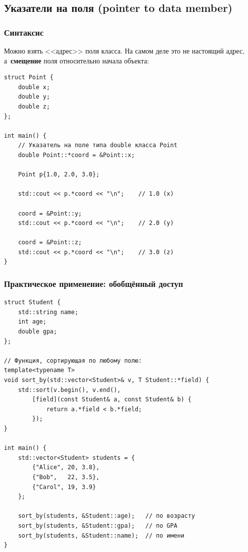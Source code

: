 \documentclass[a4paper,12pt]{article}
\begin{document}
\subsection{Указатели на поля (pointer to data member)}

\subsubsection{Синтаксис}

Можно взять <<адрес>> поля класса. На самом деле это не настоящий адрес,
а~\textbf{смещение} поля относительно начала объекта:

\begin{lstlisting}
struct Point {
    double x;
    double y;
    double z;
};

int main() {
    // Указатель на поле типа double класса Point
    double Point::*coord = &Point::x;

    Point p{1.0, 2.0, 3.0};

    std::cout << p.*coord << "\n";    // 1.0 (x)

    coord = &Point::y;
    std::cout << p.*coord << "\n";    // 2.0 (y)

    coord = &Point::z;
    std::cout << p.*coord << "\n";    // 3.0 (z)
}
\end{lstlisting}

\subsubsection{Практическое применение: обобщённый доступ}

\begin{lstlisting}
struct Student {
    std::string name;
    int age;
    double gpa;
};

// Функция, сортирующая по любому полю:
template<typename T>
void sort_by(std::vector<Student>& v, T Student::*field) {
    std::sort(v.begin(), v.end(),
        [field](const Student& a, const Student& b) {
            return a.*field < b.*field;
        });
}

int main() {
    std::vector<Student> students = {
        {"Alice", 20, 3.8},
        {"Bob",   22, 3.5},
        {"Carol", 19, 3.9}
    };

    sort_by(students, &Student::age);   // по возрасту
    sort_by(students, &Student::gpa);   // по GPA
    sort_by(students, &Student::name);  // по имени
}
\end{lstlisting}
\end{document}
